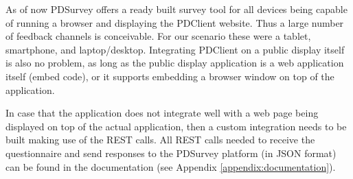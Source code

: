 	As of now PDSurvey offers a ready built survey tool for all devices being capable of running a browser and displaying the PDClient website. Thus a large number of feedback channels is conceivable. For our scenario these were a tablet, smartphone, and laptop/desktop. Integrating PDClient on a public display itself is also no problem, as long as the public display application is a web application itself (embed code), or it supports embedding a browser window on top of the application. 

	In case that the application does not integrate well with a web page being displayed on top of the actual application, then a custom integration needs to be built making use of the REST calls. All REST calls needed to receive the questionnaire and send responses to the PDSurvey platform (in JSON format) can be found in the documentation (see Appendix \ref{appendix:documentation}).



